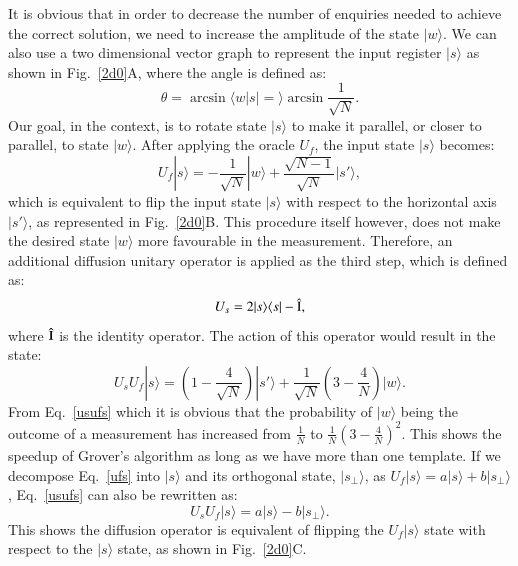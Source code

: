 \documentclass[aps,prd,nofootinbib,twocolumn,reprint,superscriptaddress,showpacs,showkeys,longbibliography]{revtex4-1}
\newcommand{\bra}[1]{\langle #1|}
\newcommand{\ket}[1]{|#1\rangle}
\newcommand{\braket}[2]{\langle #1|#2\rangle}
\begin{document}
It is obvious that in order to decrease the number of enquiries needed to achieve the correct solution, we need to increase the amplitude of the state $\ket{w}$. We can also use a two dimensional vector graph to represent the input register $\ket{s}$ as shown in Fig.~\ref{2d0}A, where the angle is defined as:
\begin{equation}
\label{theta}
   \theta=\arcsin\braket{w|s}=\arcsin {\frac{1}{\sqrt{N}}}.
\end{equation}
Our goal, in the context, is to rotate state $\ket{s}$ to make it parallel, or closer to parallel, to state $\ket{w}$. After applying the oracle $U_f$, the input state $\ket{s}$ becomes:
\begin{equation}
    \label{ufs}
    U_f\ket{s}=-\frac{1}{\sqrt{N}}\ket{w}+\frac{\sqrt{N-1}}{\sqrt{N}}\ket{s'},
\end{equation}
which is equivalent to flip the input state $\ket{s}$ with respect to the horizontal axis $\ket{s'}$, as represented in Fig.~\ref{2d0}B. This procedure itself however, does not make the desired state $\ket{w}$ more favourable in the measurement. Therefore, an additional diffusion unitary operator is applied as the third step, which is defined as:
\begin{equation}
    \label{Us}
    U_s=2\ket{s}\bra{s}-\hat{\rm I},
\end{equation}
where $\hat{\rm I}$ is the identity operator. The action of this operator would result in the state:
\begin{equation}
    \label{usufs}
    U_sU_f\ket{s}=(1-\frac{4}{\sqrt{N}})\ket{s'}+\frac{1}{\sqrt{N}}(3-\frac{4}{N})\ket{w}.
\end{equation}
From Eq.~\ref{usufs} which it is obvious that the probability of $\ket{w}$ being the outcome of a measurement has increased from $\frac{1}{N}$ to $\frac{1}{N}(3-\frac{4}{N})^2$. This shows the speedup of Grover's algorithm as long as we have more than one template. If we decompose Eq.~\ref{ufs} into $\ket{s}$ and its orthogonal state, $\ket{s_\perp}$, as $U_f\ket{s}=a\ket{s}+b\ket{s_\perp}$, Eq.~\ref{usufs} can also be rewritten as:
\begin{equation}
    \label{usufsp}
    U_sU_f\ket{s}=a\ket{s}-b\ket{s_\perp}.
\end{equation}
This shows the diffusion operator is equivalent of flipping the $U_f\ket{s}$ state with respect to the $\ket{s}$ state, as shown in Fig.~\ref{2d0}C.
\end{document}
